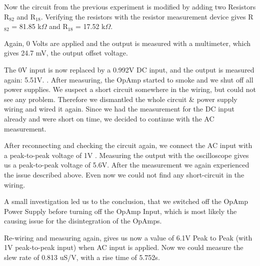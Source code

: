 %
%

Now the circuit from the previous experiment is modified by adding two Resistors R$_{82}$ and R$_{18}$. Verifying the resistors with the resistor measurement device gives R$_{82}$ = 81.85 k$\Omega$ and R$_{18}$ = 17.52 k$\Omega$.

Again, 0 Volts are applied and the output is measured with a multimeter, which gives 24.7 mV, the output offset voltage.

The 0V input is now replaced by a 0.992V DC input, and the output is measured again: 5.51V. .
\newline
After measuring, the OpAmp started to smoke and we shut off all power supplies. We suspect a short circuit somewhere in the wiring, but could not see any problem. Therefore we dismantled the whole circuit \& power supply wiring and wired it again.
Since we had the measurement for the DC input already and were short on time, we decided to continue with the AC measurement.

After reconnecting and checking the circuit again, we connect the AC input with a peak-to-peak voltage of 1V . Measuring the output with the oscilloscope gives us a peak-to-peak voltage of 5.6V. After the measurement we again experienced the issue described above. Even now we could not find any short-circuit in the wiring.

 A small investigation led us to the conclusion, that we switched off the OpAmp Power Supply before turning off the OpAmp Input, which is most likely the causing issue for the disintegration of the OpAmps.
 
 Re-wiring and measuring again, gives us now a value of 6.1V Peak to Peak (with 1V peak-to-peak input) when AC input is applied. 
 Now we could measure the slew rate of 0.813 uS/V, with a rise time of 5.752s.
 
 
 


